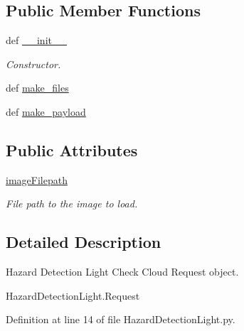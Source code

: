 \subsection*{Public Member Functions}
\begin{DoxyCompactItemize}
\item 
def \hyperlink{classRappCloud_1_1CloudMsgs_1_1HazardDetectionLight_1_1HazardDetectionLight_1_1Request_a90c49e34e45cf450daf9b46f03017d65}{\-\_\-\-\_\-init\-\_\-\-\_\-}
\begin{DoxyCompactList}\small\item\em Constructor. \end{DoxyCompactList}\item 
def \hyperlink{classRappCloud_1_1CloudMsgs_1_1HazardDetectionLight_1_1HazardDetectionLight_1_1Request_a996e3f8378fa0875d6d0f1a29ca465ae}{make\-\_\-files}
\item 
def \hyperlink{classRappCloud_1_1CloudMsgs_1_1HazardDetectionLight_1_1HazardDetectionLight_1_1Request_aaa133820b9029caf7081453f9c058749}{make\-\_\-payload}
\end{DoxyCompactItemize}
\subsection*{Public Attributes}
\begin{DoxyCompactItemize}
\item 
\hyperlink{classRappCloud_1_1CloudMsgs_1_1HazardDetectionLight_1_1HazardDetectionLight_1_1Request_ad62dadb89604b1181641b9bde0e83bc1}{image\-Filepath}
\begin{DoxyCompactList}\small\item\em File path to the image to load. \end{DoxyCompactList}\end{DoxyCompactItemize}


\subsection{Detailed Description}
\begin{DoxyVerb}Hazard Detection Light Check Cloud Request object.

HazardDetectionLight.Request
\end{DoxyVerb}
 

Definition at line 14 of file Hazard\-Detection\-Light.\-py.




